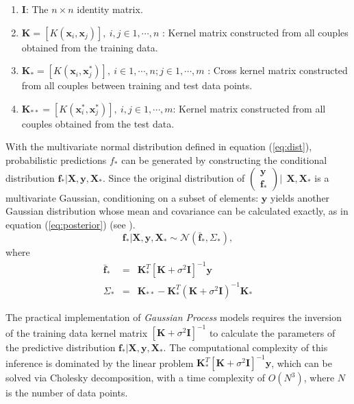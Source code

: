 \documentclass[referee,a4paper,12pt,traditabstract]{swsc}
\begin{document}
\begin{linenumbers}
\begin{enumerate}
      \item $\mathbf{I}$: The $n \times n$ identity matrix.
      \item $\mathbf{K} = [K(\mathbf{x}_i, \mathbf{x}_j)], \ i,j \in 1,\cdots,n$ : Kernel matrix constructed from all couples obtained from the training data.
      \item $\mathbf{K}_{*} = [K(\mathbf{x}_i, \mathbf{x}^{*}_j)], \ i \in 1,\cdots,n ; j \in 1,\cdots,m$ : Cross kernel matrix constructed from all couples between training and test data points.
      \item $\mathbf{K}_{**} = [K(\mathbf{x}^{*}_i, \mathbf{x}^{*}_j)], \ i,j \in 1,\cdots,m$: Kernel matrix constructed from all couples obtained from the test data.
\end{enumerate}

With the multivariate normal distribution defined in equation (\ref{eq:dist}), probabilistic predictions $f_*$ can be generated by constructing the conditional distribution $\mathbf{f_*}|\mathbf{X},\mathbf{y},\mathbf{X_*}$. Since the original distribution of $\left( \begin{array}{c} \mathbf{y} \\ \mathbf{f_*} \end{array} \right) | \ \ \mathbf{X}, \mathbf{X}_*$ is a multivariate Gaussian, conditioning on a subset of elements: $\mathbf{y}$ yields another Gaussian distribution whose mean and covariance can be calculated exactly, as in equation (\ref{eq:posterior}) (see \citet{Rasmussen:2005:GPM:1162254}).
\begin{equation}
    \mathbf{f_*}|\mathbf{X},\mathbf{y},\mathbf{X_*} \sim \mathcal{N}(\mathbf{\bar{f}_*}, \Sigma_*)  \label{eq:posterior},
\end{equation}
where
\begin{eqnarray}
    \mathbf{\bar{f}_*} & = & \mathbf{K}^T_{*} [\mathbf{K} + \sigma^{2} \mathbf{I}]^{-1} \mathbf{y} \label{eq:posteriormean} \\
    \Sigma_* & = & \mathbf{K}_{**} - \mathbf{K}^T_{*} \left(\mathbf{K} + \sigma^{2} \mathbf{I}\right)^{-1} \mathbf{K}_{*} \label{eq:posteriorcov}
\end{eqnarray}

The practical implementation of \emph{Gaussian Process} models requires the inversion of the training data kernel matrix $[\mathbf{K} + \sigma^{2} \mathbf{I}]^{-1}$ to calculate the parameters of the predictive distribution $\mathbf{f_*}|\mathbf{X},\mathbf{y},\mathbf{X_*}$. The computational complexity of this inference is dominated by the linear problem $\mathbf{K}^T_{*} [\mathbf{K} + \sigma^{2} \mathbf{I}]^{-1} \mathbf{y}$, which can be solved via Cholesky decomposition, with a time complexity of $O(N^3)$, where $N$ is the number of data points.


\end{linenumbers}
\end{document}
